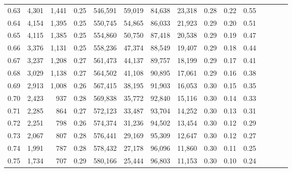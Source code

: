 \begin{tabular}{rrrcrrrrrrrrrrr}
0.63 &   4,301 &  1,441 &                                       0.25 &  546,591 &   59,019 &   84,638 &   23,318 &  0.28 &  0.22 &                         0.55 \\
0.64 &   4,154 &  1,395 &                                       0.25 &  550,745 &   54,865 &   86,033 &   21,923 &  0.29 &  0.20 &                         0.51 \\
0.65 &   4,115 &  1,385 &                                       0.25 &  554,860 &   50,750 &   87,418 &   20,538 &  0.29 &  0.19 &                         0.47 \\
0.66 &   3,376 &  1,131 &                                       0.25 &  558,236 &   47,374 &   88,549 &   19,407 &  0.29 &  0.18 &                         0.44 \\
0.67 &   3,237 &  1,208 &                                       0.27 &  561,473 &   44,137 &   89,757 &   18,199 &  0.29 &  0.17 &                         0.41 \\
0.68 &   3,029 &  1,138 &                                       0.27 &  564,502 &   41,108 &   90,895 &   17,061 &  0.29 &  0.16 &                         0.38 \\
0.69 &   2,913 &  1,008 &                                       0.26 &  567,415 &   38,195 &   91,903 &   16,053 &  0.30 &  0.15 &                         0.35 \\
0.70 &   2,423 &    937 &                                       0.28 &  569,838 &   35,772 &   92,840 &   15,116 &  0.30 &  0.14 &                         0.33 \\
0.71 &   2,285 &    864 &                                       0.27 &  572,123 &   33,487 &   93,704 &   14,252 &  0.30 &  0.13 &                         0.31 \\
0.72 &   2,251 &    798 &                                       0.26 &  574,374 &   31,236 &   94,502 &   13,454 &  0.30 &  0.12 &                         0.29 \\
0.73 &   2,067 &    807 &                                       0.28 &  576,441 &   29,169 &   95,309 &   12,647 &  0.30 &  0.12 &                         0.27 \\
0.74 &   1,991 &    787 &                                       0.28 &  578,432 &   27,178 &   96,096 &   11,860 &  0.30 &  0.11 &                         0.25 \\
0.75 &   1,734 &    707 &                                       0.29 &  580,166 &   25,444 &   96,803 &   11,153 &  0.30 &  0.10 &                         0.24 \\

\end{tabular}
